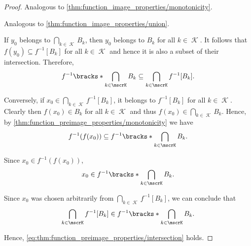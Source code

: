 \begin{proof}
   Analogous to \cref{thm:function_image_properties/monotonicity}.

   Analogous to \cref{thm:function_image_properties/union}.

   If \( y_0 \) belongs to \( \bigcap_{k \in \mscrK} B_k \), then \( y_0 \) belongs to \( B_k \) for all \( k \in \mscrK \). It follows that \( f(y_0) \subseteq f^{-1}[B_k] \) for all \( k \in \mscrK \) and hence it is also a subset of their intersection. Therefore,
  \begin{equation*}
    f^{-1} \bracks*{ \bigcap_{k \in \mscrK} B_k } \subseteq \bigcap_{k \in \mscrK} f^{-1}[B_k].
  \end{equation*}

  Conversely, if \( x_0 \in \bigcap_{k \in \mscrK} f^{-1}[B_k] \), it belongs to \( f^{-1}[B_k] \) for all \( k \in \mscrK \). Clearly then \( f(x_0) \in B_k \) for all \( k \in \mscrK \) and thus \( f(x_0) \in \bigcap_{k \in \mscrK} B_k \). Hence, by \cref{thm:function_preimage_properties/monotonicity} we have
  \begin{equation*}
    f^{-1}(f(x_0))
    \subseteq
    f^{-1}\bracks*{ \bigcap_{k \in \mscrK} B_k }.
  \end{equation*}

  Since \( x_0 \in f^{-1}(f(x_0)) \),
  \begin{equation*}
    x_0 \in f^{-1}\bracks*{ \bigcap_{k \in \mscrK} B_k }.
  \end{equation*}

  Since \( x_0 \) was chosen arbitrarily from \( \bigcap_{k \in \mscrK} f^{-1}[B_k] \), we can conclude that
  \begin{equation*}
    \bigcap_{k \in \mscrK} f^{-1}[B_k] \in f^{-1}\bracks*{ \bigcap_{k \in \mscrK} B_k }.
  \end{equation*}

  Hence, \eqref{eq:thm:function_preimage_properties/intersection} holds.


\end{proof}
